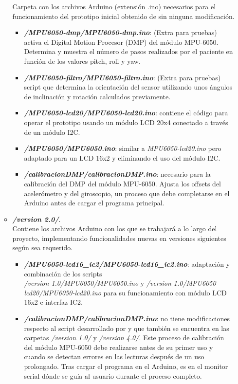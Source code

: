 \begin{itemize}
\begin{itemize}
        Carpeta con los archivos Arduino (extensión .ino) necesarios para el funcionamiento del prototipo inicial obtenido de \cite{saragonz91:online} sin ninguna modificación.
        \begin{itemize}
            \item \textbf{\textit{/MPU6050-dmp/MPU6050-dmp.ino}}: (Extra para pruebas) activa el Digital Motion Procesor (DMP) del módulo MPU-6050. Determina y muestra el número de pasos realizados por el paciente en función de los valores pitch, roll y yaw.
            \item \textbf{\textit{/MPU6050-filtro/MPU6050-filtro.ino}}: (Extra para pruebas) script que determina la orientación del sensor utilizando unos ángulos de inclinación y rotación calculados previamente.
            \item \textbf{\textit{/MPU6050-lcd20/MPU6050-lcd20.ino}}: contiene el código para operar el prototipo usando un módulo LCD 20x4 conectado a través de un módulo I2C.
            \item \textbf{\textit{/MPU6050/MPU6050.ino}}: similar a \textit{MPU6050-lcd20.ino} pero adaptado para un LCD 16x2 y eliminando el uso del módulo I2C.
            \item \textbf{\textit{/calibracionDMP/calibracionDMP.ino}}: necesario para la calibración del DMP del módulo MPU-6050. Ajusta los offsets del acelerómetro y del giroscopio, un proceso que debe completarse en el Arduino antes de cargar el programa principal.
        \end{itemize}
        \item \textbf{\textit{/version 2.0/}}.\\
        Contiene los archivos Arduino con los que se trabajará a lo largo del proyecto, implementando funcionalidades nuevas en versiones siguientes según sea requerido.
        \begin{itemize}
            \item \textbf{\textit{/MPU6050-lcd16\_ic2/MPU6050-lcd16\_ic2.ino}}: adaptación y combinación de los scripts \\\textit{/version 1.0/MPU6050/MPU6050.ino} y \textit{/version 1.0/MPU6050-lcd20/MPU6050-lcd20.ino} para su funcionamiento con módulo LCD 16x2 e interfaz IC2.
            \item \textbf{\textit{/calibracionDMP/calibracionDMP.ino}}: no tiene modificaciones respecto al script desarrollado por \cite{saragonz91:online} y que también se encuentra en las carpetas \textit{/version 1.0/} y \textit{/version 4.0/}. Este proceso de calibración del módulo MPU-6050 debe realizarse antes de su primer uso y cuando se detectan errores en las lecturas después de un uso prolongado. Tras cargar el programa en el Arduino, es en el monitor serial dónde se guía al usuario durante el proceso completo.

\end{itemize}
\end{itemize}
\end{itemize}
